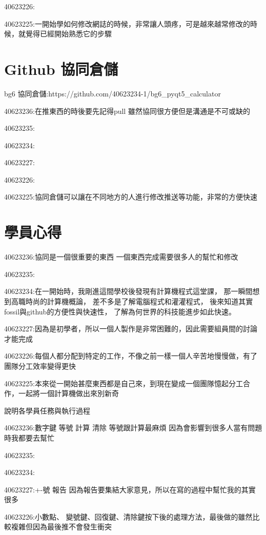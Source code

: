 \documentclass[12pt,,]{report}
\begin{document}
40623226:

40623225:一開始學如何修改網誌的時候，非常讓人頭疼，可是越來越常修改的時候，就覺得已經開始熟悉它的步驟

\hypertarget{github-ux5354ux540cux5009ux5132}{%
\section{Github 協同倉儲}\label{github-ux5354ux540cux5009ux5132}}

bg6 協同倉儲:https://github.com/40623234-1/bg6\_pyqt5\_calculator

40623236:在推東西的時後要先記得pull 雖然協同很方便但是溝通是不可或缺的

40623235:

40623234:

40623227:

40623226:

40623225:協同倉儲可以讓在不同地方的人進行修改推送等功能，非常的方便快速

\hypertarget{ux5b78ux54e1ux5fc3ux5f97}{%
\section{學員心得}\label{ux5b78ux54e1ux5fc3ux5f97}}

40623236:協同是一個很重要的東西 一個東西完成需要很多人的幫忙和修改

40623235:

40623234:在一開始時，我剛進這間學校後發現有計算機程式這堂課，
那一瞬間想到高職時尚的計算機概論， 差不多是了解電腦程式和灌灌程式，
後來知道其實fossil與github的方便性與快速性，
了解為何世界的科技能進步如此快速。

40623227:因為是初學者，所以一個人製作是非常困難的，因此需要組員間的討論才能完成

40623226:每個人都分配到特定的工作，不像之前一樣一個人辛苦地慢慢做，有了團隊分工效率變得更快

40623225:本來從一開始甚麼東西都是自己來，到現在變成一個團隊憶起分工合作，一起將一個計算機做出來別新奇

說明各學員任務與執行過程

40623236:數字鍵 等號 計算 清除 等號跟計算最麻煩
因為會影響到很多人當有問題時我都要去幫忙

40623235:

40623234:

40623227:+-號 報告
因為報告要集結大家意見，所以在寫的過程中幫忙我的其實很多

40623226:小數點、
變號鍵、回復鍵、清除鍵按下後的處理方法，最後做的雖然比較複雜但因為最後推不會發生衝突
\end{document}
